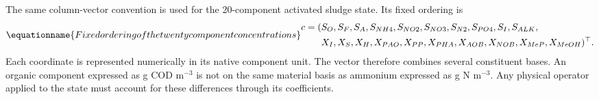 The same column-vector convention is used for the 20-component activated sludge state. Its fixed ordering is
\begin{equation}
\equationname{Fixed ordering of the twenty component concentrations}
\begin{split}
c=(&S_O,S_F,S_A,S_{NH4},S_{NO2},S_{NO3},S_{N2},S_{PO4},S_I,S_{ALK},\\
&X_I,X_S,X_H,X_{PAO},X_{PP},X_{PHA},X_{AOB},X_{NOB},X_{MeP},X_{MeOH})^\top.
\end{split}
\label{eq:component_order}
\end{equation}
Each coordinate is represented numerically in its native component unit. The vector therefore combines several constituent bases. An organic component expressed as g COD m$^{-3}$ is not on the same material basis as ammonium expressed as g N m$^{-3}$. Any physical operator applied to the state must account for these differences through its coefficients.

